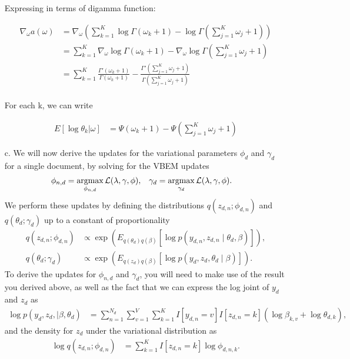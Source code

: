 \documentclass [12pt]{article}
\newcommand{\argmax}{\operatornamewithlimits{argmax}}
\begin{document}
\begin{itemize}
Expressing in terms of digamma function:

\begin{align*}
    	\nabla_\omega a(\omega) &= \nabla_\omega \left( \sum_{k=1}^K \log{\Gamma(\omega_k +1) - \log{\Gamma \left(\sum_{j=1}^K  \omega_j +1\right)}} \right) \\
    	&= \sum_{k=1}^K \nabla_\omega \log{\Gamma(\omega_k +1) - \nabla_\omega \log{\Gamma \left(\sum_{j=1}^K  \omega_j +1\right)}}  \\
    	&= \sum_{k=1}^K \frac{\Gamma' (\omega_k +1)}{\Gamma(\omega_k +1)} - \frac{\Gamma' (\sum_{j=1}^K  \omega_j +1)}{\Gamma(\sum_{j=1}^K  \omega_j +1)} \\
\end{align*}

For each k, we can write

\begin{align*}
    E[\log \theta_k | \omega] &= \Psi(\omega_k +1) - \Psi(\sum_{j=1}^K \omega_j + 1)
\end{align*}



\item[c.] We will now derive the updates for the variational parameters $\phi_d$ and $\gamma_d$ for a single document, by solving for the VBEM updates
\begin{align*}
	\phi_{n,d} 
    &= 
    \argmax_{\phi_{n,d}} \mathcal{L}(\lambda, \gamma, \phi),
    &
	\gamma_d 
    &= 
    \argmax_{\gamma_d} \mathcal{L}(\lambda, \gamma, \phi).
\end{align*}
We perform these updates by defining the distributions $q(z_{d,n} ; \phi_{d,n})$ and $q(\theta_{d} ; \gamma_d)$ up to a constant of proportionality
\begin{align*}
	q(z_{d,n} ; \phi_{d,n})
    &\propto
    \exp 
    \left(
    E_{q(\theta_d) q(\beta)}
    \left[
    	\log p(y_{d,n}, z_{d,n} \mid \theta_d, \beta)
    \right]
    \right),
    \\
	q(\theta_{d} ; \gamma_d)
    &\propto
    \exp 
    \left(
    E_{q(z_d) q(\beta)}
    \left[
    	\log p(y_{d}, z_{d}, \theta_d \mid \beta)
    \right]
    \right).
\end{align*}
To derive the updates for $\phi_{n,d}$ and $\gamma_d$, you will need to make use of the result you derived above, as well as the fact that we can express the log joint of $y_{d}$ and $z_{d}$ as
\begin{align*}
	\log p(y_d, z_d, \mid \beta, \theta_d)
    &= 
    \sum_{n=1}^{N_d}
    \sum_{v=1}^V
    \sum_{k=1}^K
    I[y_{d,n}=v]
    I[z_{d,n}=k]
	\left( 
    	\log \beta_{k,v} + \log \theta_{d,k}
    \right),
\end{align*}
and the density for $z_d$ under the variational distribution as
\begin{align*}
	\log q(z_{d,n} ; \phi_{d,n}) 
    &= \sum_{k=1}^K I[z_{d,n}=k] \log \phi_{d,n,k}.
\end{align*}


\end{itemize}
\end{document}

